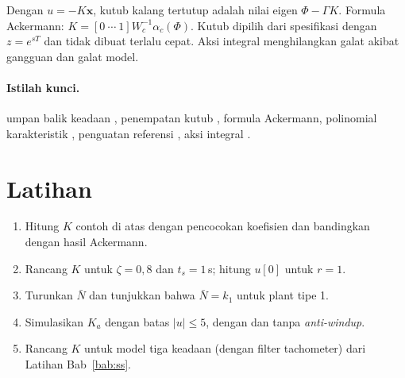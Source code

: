 \begin{ringkasan}
	Dengan $u = -K\mathbf{x}$, kutub kalang tertutup adalah nilai eigen $\Phi - \Gamma K$. Formula Ackermann: $K = [0\ \cdots\ 1]W_c^{-1}\alpha_c(\Phi)$. Kutub dipilih dari spesifikasi dengan $z = e^{sT}$ dan tidak dibuat terlalu cepat. Aksi integral menghilangkan galat akibat gangguan dan galat model.\\[3pt]
\end{ringkasan}

\paragraph{Istilah kunci.} umpan balik keadaan , penempatan kutub , formula Ackermann, polinomial karakteristik , penguatan referensi , aksi integral .

\section*{Latihan}
\begin{enumerate}
	\item Hitung $K$ contoh di atas dengan pencocokan koefisien dan bandingkan dengan hasil Ackermann.
	\item Rancang $K$ untuk $\zeta = 0{,}8$ dan $t_s = 1$\,s; hitung $u[0]$ untuk $r = 1$.
	\item Turunkan $\bar N$ dan tunjukkan bahwa $\bar N = k_1$ untuk plant tipe 1.
	\item Simulasikan $K_a$ dengan batas $|u| \le 5$, dengan dan tanpa \textit{anti-windup}.
	\item Rancang $K$ untuk model tiga keadaan (dengan filter tachometer) dari Latihan Bab~\ref{bab:ss}.
\end{enumerate}
